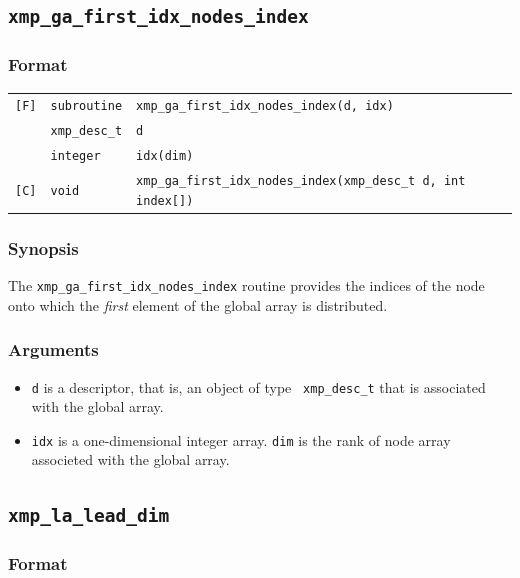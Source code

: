 \subsection{\tt xmp\_ga\_first\_idx\_nodes\_index}

\subsubsection*{Format}

\begin{tabular}{lll}

\verb![F]!&  {\tt subroutine}& {\tt xmp\_ga\_first\_idx\_nodes\_index(d, idx)}\\
          & {\tt xmp\_desc\_t} & {\tt d}\\
          & {\tt integer} & {\tt idx(dim)}\\

\verb![C]!&  {\tt void}& {\tt xmp\_ga\_first\_idx\_nodes\_index(xmp\_desc\_t d, int index[])}\\

\end{tabular}

\subsubsection*{Synopsis}

The {\tt xmp\_ga\_first\_idx\_nodes\_index} routine provides the indices
of the node onto which the {\it first} element of the global array is
distributed.

\subsubsection*{Arguments}

\begin{itemize}
 \item {\tt d} is a descriptor, that is, an object of type {\tt
       xmp\_desc\_t} that is associated with the global array.
 \item {\tt idx} is a one-dimensional integer array. {\tt dim} is the
       rank of node array associeted with the global array.
\end{itemize}


\subsection{\tt xmp\_la\_lead\_dim}

\subsubsection*{Format}

